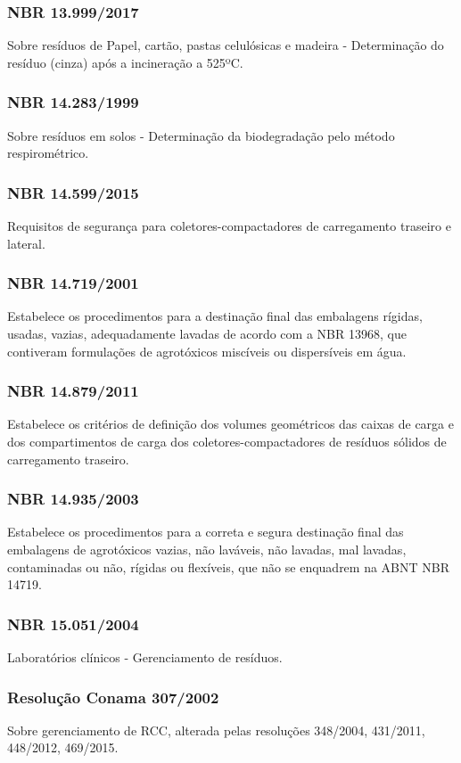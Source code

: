 \begin{subapend}
\begin{subsubapend}
		\subsubsection{NBR 13.999/2017}
		Sobre resíduos de Papel, cartão, pastas celulósicas e madeira - Determinação do resíduo (cinza) após a incineração a 525ºC.
		\subsubsection{NBR 14.283/1999}
		Sobre resíduos em solos - Determinação da biodegradação pelo método respirométrico.
		\subsubsection{NBR 14.599/2015}
		Requisitos de segurança para coletores-compactadores de carregamento traseiro e lateral.
		\subsubsection{NBR 14.719/2001}
		Estabelece os procedimentos para a destinação final das embalagens rígidas, usadas, vazias, adequadamente lavadas de acordo com a NBR 13968, que contiveram formulações de agrotóxicos miscíveis ou dispersíveis em água.
		\subsubsection{NBR 14.879/2011}
		Estabelece os critérios de definição dos volumes geométricos das caixas de carga e dos compartimentos de carga dos coletores-compactadores de resíduos sólidos de carregamento traseiro.
		\subsubsection{NBR 14.935/2003}
		Estabelece os procedimentos para a correta e segura destinação final das embalagens de agrotóxicos vazias, não laváveis, não lavadas, mal lavadas, contaminadas ou não, rígidas ou flexíveis, que não se enquadrem na ABNT NBR 14719.
		\subsubsection{NBR 15.051/2004}
		Laboratórios clínicos - Gerenciamento de resíduos.
		\subsubsection{Resolução Conama 307/2002}
		Sobre gerenciamento de RCC, alterada pelas resoluções 348/2004, 431/2011, 448/2012, 469/2015.

\end{subsubapend}
\end{subapend}

